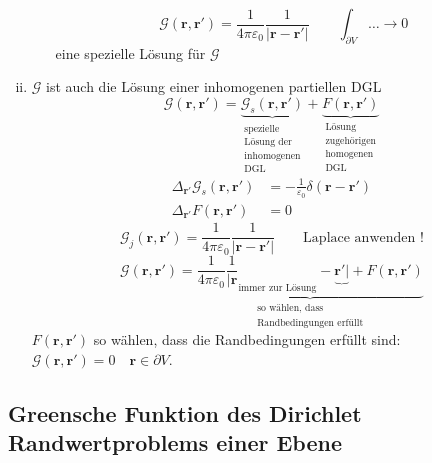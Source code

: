 \documentclass[titlepage,11pt,a4paper,ngerman]{report}
\newcommand{\tx}[1]{\textrm{#1}}
\newcommand{\ub}[1]{\underbrace{#1}}
\newcommand{\gre}{\mathcal{G}}
\newcommand{\kq}{\frac{1}{4\pi\epsilon_0}}
\renewcommand{\vec}[1]{\boldsymbol{#1}}
\renewcommand{\epsilon}{\varepsilon}
\begin{document}
\begin{enumerate}[i)]
\begin{enumerate}[1)]
		\begin{equation*}
		\gre(\vec{r},\vec{r}') = \kq \frac{1}{|\vec{r} - \vec{r}'|} \qquad \int_{\partial V} \dots \rightarrow 0
		\end{equation*}
		eine spezielle Lösung für $ \gre $
	\end{enumerate}
	\item $ \gre $ ist auch die Lösung einer inhomogenen partiellen DGL
	\begin{equation*}
	\gre(\vec{r},\vec{r}') = \ub{\gre_s(\vec{r},\vec{r}')}_{\substack{\tx{spezielle} \\ \tx{Lösung der} \\ \tx{inhomogenen} \\ \tx{DGL}}} + \ub{F(\vec{r},\vec{r}')}_{\substack{\tx{Lösung} \\ \tx{zugehörigen} \\ \tx{homogenen} \\ \tx{DGL}}}
	\end{equation*}
	\begin{align*}
	\Delta_{\vec{r}'} \gre_s(\vec{r},\vec{r}') &= - \frac{1}{\epsilon_0} \delta(\vec{r} - \vec{r}')\\
	\Delta_{\vec{r}'} F(\vec{r},\vec{r}') \, &= 0
	\end{align*}
	\begin{equation*}
	\gre_j(\vec{r},\vec{r}') = \kq \frac{1}{|\vec{r} - \vec{r}'|} \qquad \tx{Laplace anwenden !}
	\end{equation*}
	\begin{equation*}
	\gre(\vec{r},\vec{r}') = \ub{\kq \frac{1}{|\vec{r}}_{\tx{immer zur Lösung}} - \ub{\vec{r}'|} + F(\vec{r},\vec{r}')}_{\substack{\tx{so wählen, dass} \\ \tx{Randbedingungen erfüllt}}}
	\end{equation*}
	$ F(\vec{r},\vec{r}') $ so wählen, dass die Randbedingungen erfüllt sind: $ \gre(\vec{r},\vec{r}') = 0 \quad \vec{r} \in \partial V $.
\end{enumerate}

\subsection{Greensche Funktion des Dirichlet Randwertproblems einer Ebene}
\end{document}
